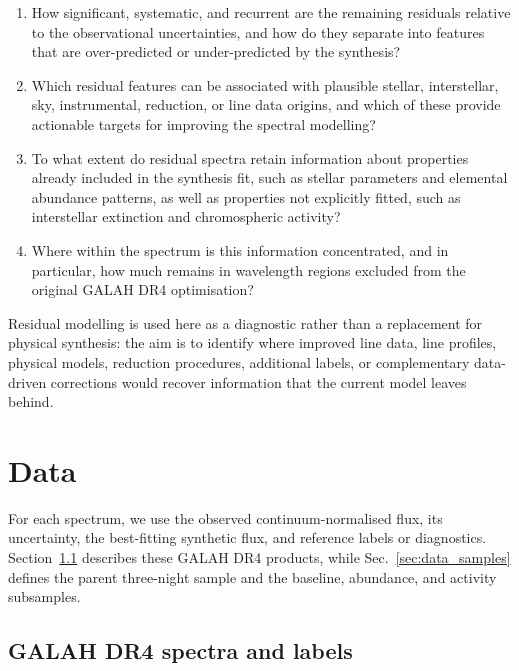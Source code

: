 \documentclass[twocolumn,apj,numberedappendix,appendixfloats]{openjournal}
\begin{document}
\begin{enumerate}[leftmargin=1.3em,labelwidth=0em]
    \item How significant, systematic, and recurrent are the remaining residuals relative to the observational uncertainties, and how do they separate into features that are over-predicted or under-predicted by the synthesis?
    \item Which residual features can be associated with plausible stellar, interstellar, sky, instrumental, reduction, or line data origins, and which of these provide actionable targets for improving the spectral modelling?
    \item To what extent do residual spectra retain information about properties already included in the synthesis fit, such as stellar parameters and elemental abundance patterns, as well as properties not explicitly fitted, such as interstellar extinction and chromospheric activity?
    \item Where within the spectrum is this information concentrated, and in particular, how much remains in wavelength regions excluded from the original GALAH DR4 optimisation?
\end{enumerate}

Residual modelling is used here as a diagnostic rather than a replacement for physical synthesis: the aim is to identify where improved line data, line profiles, physical models, reduction procedures, additional labels, or complementary data-driven corrections would recover information that the current model leaves behind.

\section{Data} \label{sec:data}

For each spectrum, we use the observed continuum-normalised flux, its uncertainty, the best-fitting synthetic flux, and reference labels or diagnostics. Section~\ref{sec:data_galah} describes these GALAH DR4 products, while Sec.~\ref{sec:data_samples} defines the parent three-night sample and the baseline, abundance, and activity subsamples.

\subsection{GALAH DR4 spectra and labels}
\label{sec:data_galah}
\end{document}
